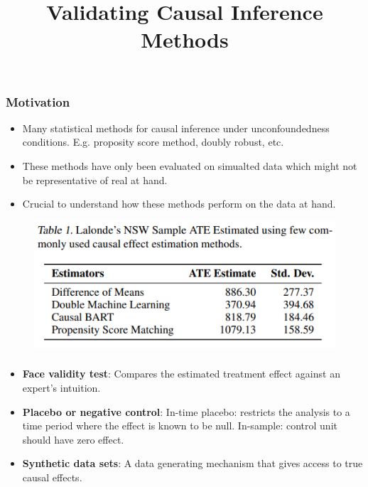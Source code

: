 \documentclass{beamer}
\begin{document}
\title[]{Validating Causal Inference Methods}
\author [] {}
\date{}

\begin{frame}
	\frametitle{Motivation}
	\begin{itemize}
		\item Many statistical methods for causal inference under unconfoundedness conditions. E.g. proposity score method, doubly robust, etc.
		\item These methods have only been evaluated on simualted data which might not be representative of real at hand.
		\item Crucial to understand how these methods perform on the data at hand.
	\end{itemize}
	\begin{figure}
		\includegraphics[scale=0.6]{imgs/comparison.png}
	\end{figure}
\end{frame}
\begin{frame}
	\frametitle{}
	\begin{itemize}
		\item \textbf{Face validity test}: Compares the estimated treatment effect against an expert's intuition.
		\item \textbf{Placebo or negative control}: In-time placebo: restricts the analysis to a time period where the effect is known to be null. In-sample: control unit should have zero effect.
		\item \textbf{Synthetic data sets}: A data generating mechanism that gives access to true causal effects.
	\end{itemize}
\end{frame}
\end{document}
